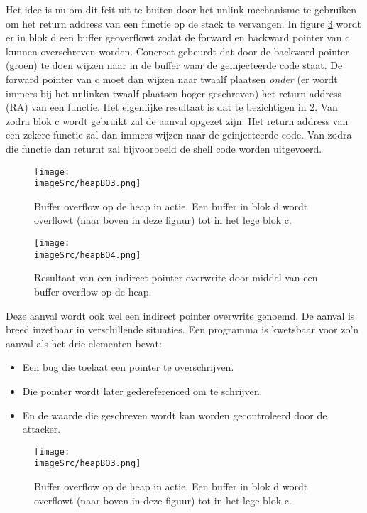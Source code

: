 \documentclass[../main.tex]{subfiles}
\begin{document}
Het idee is nu om dit feit uit te buiten door het unlink mechanisme te gebruiken om het return address van een functie op de stack te vervangen.
In figure \ref{f:heapBO3} wordt er in blok d een buffer geoverflowt zodat de forward en backward pointer van c kunnen overschreven worden.
Concreet gebeurdt dat door de backward pointer (groen) te doen wijzen naar in de buffer waar de geinjecteerde code staat.
De forward pointer van c moet dan wijzen naar twaalf plaatsen \emph{onder} (er wordt immers bij het unlinken twaalf plaatsen hoger geschreven) het return address (RA) van een functie.
Het eigenlijke resultaat is dat te bezichtigen in \ref{f:heapBO4}.
Van zodra blok c wordt gebruikt zal de aanval opgezet zijn.
Het return address van een zekere functie zal dan immers wijzen naar de geinjecteerde code.
Van zodra die functie dan returnt zal bijvoorbeeld de shell code worden uitgevoerd.

\begin{figure}
\centering
\texttt{[image: \\imageSrc/heapBO3.png]}
\caption{Buffer overflow op de heap in actie. Een buffer in blok d wordt overflowt (naar boven in deze figuur) tot in het lege blok c.}
\label{f:heapBO3}
\end{figure}

\begin{figure}
\centering
\texttt{[image: \\imageSrc/heapBO4.png]}
\caption{Resultaat van een indirect pointer overwrite door middel van een buffer overflow op de heap.}
\label{f:heapBO4}
\end{figure}

Deze aanval wordt ook wel een indirect pointer overwrite genoemd.
De aanval is breed inzetbaar in verschillende situaties.
Een programma is kwetsbaar voor zo'n aanval als het drie elementen bevat:
\begin{itemize}
		\item Een bug die toelaat een pointer te overschrijven.
		\item Die pointer wordt later gedereferenced om te schrijven.
		\item En de waarde die geschreven wordt kan worden gecontroleerd door de attacker.
\end{itemize}


\begin{figure}
\centering
\texttt{[image: \\imageSrc/heapBO3.png]}
\caption{Buffer overflow op de heap in actie. Een buffer in blok d wordt overflowt (naar boven in deze figuur) tot in het lege blok c.}
\label{f:heapBO3}
\end{figure}
\end{document}
